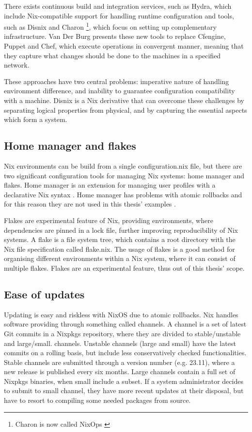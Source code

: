 There exists continuous build and integration services, such as Hydra,
which include Nix-compatible support for handling runtime
configuration and tools, such as Disnix and Charon \footnote{Charon is
now called NixOps \cite{githubNixNixpkgsNixOS}}, which focus on
setting up complementary infrastructure. Van Der Burg presents these
new tools to replace Cfengine, Puppet and Chef, which execute
operations in convergent manner, meaning that they capture what
changes should be done to the machines in a specified
network. \cite{van2013reference}

These approaches have two central problems: imperative nature of
handling environment difference, and inability to guarantee
configuration compatibility with a machine. Disnix is a Nix derivative
that can overcome these challenges by separating logical properties
from physical, and by capturing the essential aspects which form a
system. \cite{van2013reference}

\subsection{Home manager and flakes}

Nix environments can be build from a single configuration.nix file,
but there are two significant configuration tools for managing Nix
systems: home manager and flakes. Home manager is an extension for
managing user profiles with a declarative Nix syntax
\cite{nixcommunityHomeManager}. Home manager has problems with atomic
rollbacks and for this reason they are not used in this thesis'
examples \cite{nixcommunityHomeManager}.

Flakes are experimental feature of Nix, providing environments, where
dependencies are pinned in a lock file, further improving
reproducibility of Nix systems. A flake is a
file system tree, which contains a root directory with the Nix file
specification called flake.nix. The usage of flakes is a good method
for organising different environments within a Nix system, where it
can consist of multiple flakes. Flakes are an experimental
feature, thus out of this thesis' scope. \cite{nixosFlakesNixOS}
\subsection{Ease of updates}

Updating is easy and riskless with NixOS due to atomic
rollbacks. Nix handles software providing through something called
channels. A channel is a set of latest Git commits in a Nixpkgs
repository, where they are divided to stable/unstable and
large/small. channels. Unstable channels (large and small) have the
latest commits on a rolling basis, but include less conservatively
checked functionalities. Stable channels are submitted through a
version number (e.g. 23.11), where a new release is published every
six months. Large channels contain a full set of
Nixpkgs binaries, when small include a subset. If a system
administrator decides to submit to small channel, they have more
recent updates at their disposal, but have to resort to compiling some
needed packages from source. \cite{nixosChannelsNixOS}

